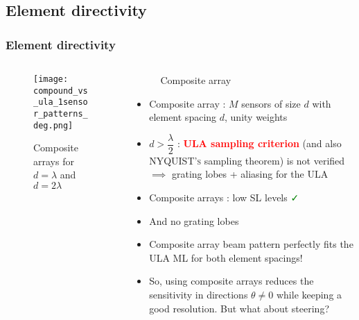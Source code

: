 \documentclass[UKenglish,8pt,aspectratio=1610]{beamer}
\begin{document}
	\subsection{Element directivity}
	\begin{frame}
		\frametitle{Element directivity}
		
			\begin{columns}
			
			\begin{column}{0.4\textwidth}
			\vspace{-15pt}
			\begin{figure}[h!]
				\centering
				\texttt{[image: compound\_vs\_ula\_1sensor\_patterns\_deg.png]}
				\caption{Composite arrays for $d=\lambda$ and $d=2\lambda$}
			\end{figure}
	
				
			\end{column}
			
			\begin{column}{0.6\textwidth}
				\vspace{-20pt}
			\begin{figure}[h!]
			\centering
			\caption{Composite array}
			\end{figure}
			\begin{itemize}
				\item Composite array : $M$ sensors of size $d$ with element spacing $d$, unity weights
				\item $d>\dfrac{\lambda}{2}$ : \textcolor{red}{\textbf{ULA sampling criterion}} (and also \textsc{NYQUIST's} sampling theorem) is not verified \textcolor{red}{\faTimes}$\implies$ grating lobes + aliasing for the ULA 
				\item Composite arrays : low SL levels \textcolor{green}{\faCheck}
				\item And no grating lobes
				\item Composite array beam pattern perfectly fits the ULA ML for both element spacings!
				\item So, using composite arrays reduces the sensitivity in directions $\theta\neq 0$ while keeping a good resolution. But what about steering?
			\end{itemize}
			\end{column}
	
		\end{columns}
			\end{frame}
		
\end{document}
